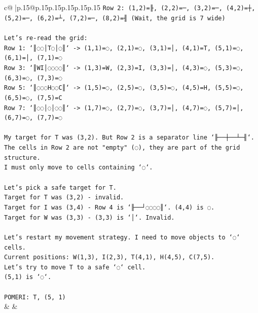 \documentclass{article}
\begin{document}
{\begin{supertabular}{c@{$\;$}|p{.15\linewidth}@{}p{.15\linewidth}p{.15\linewidth}p{.15\linewidth}p{.15\linewidth}p{.15\linewidth}}
{{{\texttt{Row 2: (1,2)=╟, (2,2)=─, (3,2)=─, (4,2)=┼, (5,2)=─, (6,2)=┴, (7,2)=─, (8,2)=╢ (Wait, the grid is 7 wide)} \\
\\ 
\texttt{Let's re{-}read the grid:} \\
\texttt{Row 1: `║◌◌│T◌│◌║` {-}> (1,1)=◌, (2,1)=◌, (3,1)=│, (4,1)=T, (5,1)=◌, (6,1)=│, (7,1)=◌} \\
\texttt{Row 3: `║WI│◌◌◌◌║` {-}> (1,3)=W, (2,3)=I, (3,3)=│, (4,3)=◌, (5,3)=◌, (6,3)=◌, (7,3)=◌} \\
\texttt{Row 5: `║◌◌◌H◌◌C║` {-}> (1,5)=◌, (2,5)=◌, (3,5)=◌, (4,5)=H, (5,5)=◌, (6,5)=◌, (7,5)=C} \\
\texttt{Row 7: `║◌◌│◌│◌◌║` {-}> (1,7)=◌, (2,7)=◌, (3,7)=│, (4,7)=◌, (5,7)=│, (6,7)=◌, (7,7)=◌} \\
\\ 
\texttt{My target for T was (3,2). But Row 2 is a separator line `╟──┼──┴─╢`.} \\
\texttt{The cells in Row 2 are not "empty" (◌), they are part of the grid structure.} \\
\texttt{I must only move to cells containing `◌`.} \\
\\ 
\texttt{Let's pick a safe target for T.} \\
\texttt{Target for T was (3,2) {-} invalid.} \\
\texttt{Target for I was (3,4) {-} Row 4 is `╟──┘◌◌◌◌║`. (4,4) is ◌.} \\
\texttt{Target for W was (3,3) {-} (3,3) is `│`. Invalid.} \\
\\ 
\texttt{Let's restart my movement strategy. I need to move objects to `◌` cells.} \\
\texttt{Current positions: W(1,3), I(2,3), T(4,1), H(4,5), C(7,5).} \\
\texttt{Let's try to move T to a safe `◌` cell.} \\
\texttt{(5,1) is `◌`.} \\
\\ 
\texttt{POMERI: T, (5, 1)} \\
            }
        }
    }
    & & \\ \\


\end{supertabular}}
\end{document}
